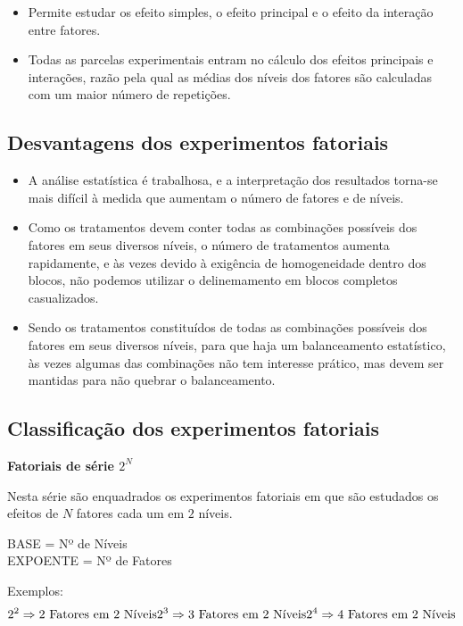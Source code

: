 \documentclass[
]{article}
\begin{document}
\begin{itemize}
\item
  Permite estudar os efeito simples, o efeito principal e o efeito da
  interação entre fatores.
\item
  Todas as parcelas experimentais entram no cálculo dos efeitos
  principais e interações, razão pela qual as médias dos níveis dos
  fatores são calculadas com um maior número de repetições.
\end{itemize}

\subsection{Desvantagens dos experimentos
fatoriais}\label{desvantagens-dos-experimentos-fatoriais}

\begin{itemize}
\item
  A análise estatística é trabalhosa, e a interpretação dos resultados
  torna-se mais difícil à medida que aumentam o número de fatores e de
  níveis.
\item
  Como os tratamentos devem conter todas as combinações possíveis dos
  fatores em seus diversos níveis, o número de tratamentos aumenta
  rapidamente, e às vezes devido à exigência de homogeneidade dentro dos
  blocos, não podemos utilizar o delinemamento em blocos completos
  casualizados.
\item
  Sendo os tratamentos constituídos de todas as combinações possíveis
  dos fatores em seus diversos níveis, para que haja um balanceamento
  estatístico, às vezes algumas das combinações não tem interesse
  prático, mas devem ser mantidas para não quebrar o balanceamento.
\end{itemize}

\subsection{Classificação dos experimentos
fatoriais}\label{classificauxe7uxe3o-dos-experimentos-fatoriais}

\textbf{Fatoriais de série \(2^N\)}

Nesta série são enquadrados os experimentos fatoriais em que são
estudados os efeitos de \(N\) fatores cada um em \(2\) níveis.

BASE = Nº de Níveis\\
EXPOENTE = Nº de Fatores

Exemplos: \[
2^2 \Rightarrow \text{2 Fatores em 2 Níveis} \\
2^3 \Rightarrow \text{3 Fatores em 2 Níveis} \\
2^4 \Rightarrow \text{4 Fatores em 2 Níveis} \\
\]
\end{document}
